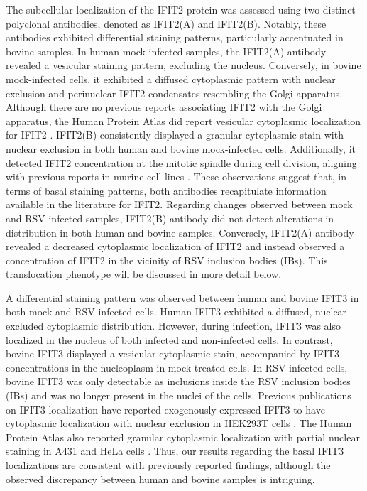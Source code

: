 The subcellular localization of the IFIT2 protein was assessed using two distinct polyclonal antibodies, denoted as IFIT2(A) and IFIT2(B). Notably, these antibodies exhibited differential staining patterns, particularly accentuated in bovine samples. In human mock-infected samples, the IFIT2(A) antibody revealed a vesicular staining pattern, excluding the nucleus. Conversely, in bovine mock-infected cells, it exhibited a diffused cytoplasmic pattern with nuclear exclusion and perinuclear IFIT2 condensates resembling the Golgi apparatus. Although there are no previous reports associating IFIT2 with the Golgi apparatus, the Human Protein Atlas did report vesicular cytoplasmic localization for IFIT2 \cite{Thul2017AProteome}. IFIT2(B) consistently displayed a granular cytoplasmic stain with nuclear exclusion in both human and bovine mock-infected cells. Additionally, it detected IFIT2 concentration at the mitotic spindle during cell division, aligning with previous reports in murine cell lines \cite{Saha2006IdentificationProtein}. These observations suggest that, in terms of basal staining patterns, both antibodies recapitulate information available in the literature for IFIT2. Regarding changes observed between mock and RSV-infected samples, IFIT2(B) antibody did not detect alterations in distribution in both human and bovine samples. Conversely, IFIT2(A) antibody revealed a decreased cytoplasmic localization of IFIT2 and instead observed a concentration of IFIT2 in the vicinity of RSV inclusion bodies (IBs). This translocation phenotype will be discussed in more detail below.

A differential staining pattern was observed between human and bovine IFIT3 in both mock and RSV-infected cells. Human IFIT3 exhibited a diffused, nuclear-excluded cytoplasmic distribution. However, during infection, IFIT3 was also localized in the nucleus of both infected and non-infected cells. In contrast, bovine IFIT3 displayed a vesicular cytoplasmic stain, accompanied by IFIT3 concentrations in the nucleoplasm in mock-treated cells. In RSV-infected cells, bovine IFIT3 was only detectable as inclusions inside the RSV inclusion bodies (IBs) and was no longer present in the nuclei of the cells. Previous publications on IFIT3 localization have reported exogenously expressed IFIT3 to have cytoplasmic localization with nuclear exclusion in HEK293T cells \cite{Huang2008Interferon-inducedCells, Liu2011IFN-InducedTBK1}. The Human Protein Atlas also reported granular cytoplasmic localization with partial nuclear staining in A431 and HeLa cells \cite{Thul2017AProteome}. Thus, our results regarding the basal IFIT3 localizations are consistent with previously reported findings, although the observed discrepancy between human and bovine samples is intriguing.

